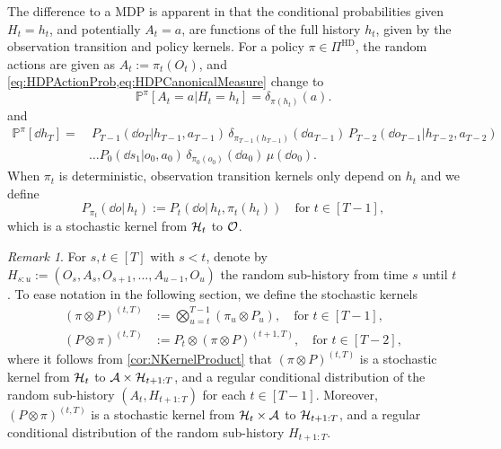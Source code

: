\documentclass[
    a4paper,
    11pt,
    bibliography=totoc,
    listof=totoc,      
    headinclude=true,
    cleardoublepage=empty,
]{scrbook}
\theoremstyle{plain}
\theoremstyle{definition}
\theoremstyle{remark}
\newtheorem{remark}[theorem]{Remark}
\newcommand{\PM}{\mathbb P}
\newcommand{\SpaceA}{{\cal A}}
\newcommand{\SpaceO}{{\cal O}}
\newcommand{\SpaceH}{{\cal H}}
\begin{document}
The difference to a MDP is apparent in that the conditional 
probabilities given $H_t=h_t$, and potentially $A_t=a$, are functions of the 
full history $h_t$, given by the observation transition and policy kernels.
For a policy $\pi\in\Pi^{\text{HD}}$, the random actions are given as $A_t := 
\pi_t(O_t)$, and \cref{eq:HDPActionProb,eq:HDPCanonicalMeasure} change to
\begin{equation*}
    \PM^\pi[A_t = a|H_t = h_t] = \delta_{\pi(h_t)}(a).
\end{equation*}
and
\begin{equation*}
\begin{split}    
    \PM^\pi [\dd{h_T}] 
    = &\ P_{T-1}(\dd o_T | h_{T-1}, a_{T-1})\, 
        \delta_{\pi_{T-1}(h_{T-1})}(\dd a_{T-1})\,
            P_{T-2}(\dd o_{T-1} | h_{T-2}, a_{T-2}) \\
    &\dots P_{0}(\dd s_1 | o_0, a_0)\, 
        \delta_{\pi_0(o_0)}(\dd a_0)\, 
            \mu(\dd o_0).
\end{split}
\end{equation*}
When $\pi_t$ is deterministic, observation transition kernels only depend on $h_t$ and we define
\[
     P_{\pi_t}(\dd{o} |\,h_t) := P_t(\dd{o} |\, h_t, \pi_t(h_t))
     \quad \text{for } t\in[T-1],
\]
which is a stochastic kernel from $\SpaceH_t$ to $\SpaceO$.

\begin{remark}
For $s,t\in[T]$ with $s<t$, denote by $H_{s:u} := (O_s, A_s, O_{s+1}, \dots, A_{u-1}, O_u)$ the random sub-history from time $s$ until $t$. To ease notation in the following section, we define the stochastic kernels 
\begin{align}
\label{eq:PolicyTransitionKernelProduct}
    (\pi \otimes P)^{(t,T)} 
    & := \bigotimes_{u=t}^{T-1} (\pi_u\otimes P_u), 
    \quad \text{for } t\in[T-1],\\
\label{eq:TransitionKernelPolicyProduct}    
    (P \otimes \pi)^{(t,T)}
    & := P_t \otimes (\pi \otimes P)^{(t+1,T)},
    \quad \text{for } t\in[T-2],
\end{align}
where it follows from \cref{cor:NKernelProduct} that $(\pi \otimes 
P)^{(t,T)}$ is a stochastic kernel from $\SpaceH_t$ to $\SpaceA \times
\SpaceH_{t+1:T}$, and a regular conditional distribution of the random 
sub-history $(A_t, H_{t+1:T})$ for each $t\in[T-1]$. Moreover, $(P \otimes 
\pi)^{(t,T)}$ is a stochastic kernel from $\SpaceH_t\times\SpaceA$ to 
$\SpaceH_{t+1:T}$, and a regular conditional distribution of the random sub-history $H_{t+1:T}$.

\end{remark}
\end{document}
